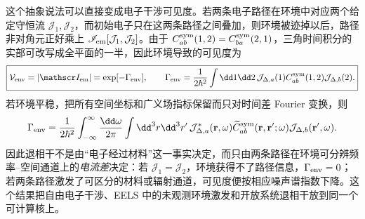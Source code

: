 这个抽象说法可以直接变成电子干涉可见度。若两条电子路径在环境中对应两个给定守恒流 $\mathcal J_1,\mathcal J_2$，而初始电子只在这两条路径之间叠加，则环境被迹掉以后，路径非对角元正好乘上 $\mathscr I_{\rm em}[\mathcal J_1,\mathcal J_2]$。由于 $C_{ab}^{\rm sym}(1,2)=C_{ba}^{\rm sym}(2,1)$，三角时间积分的实部可改写成全平面的一半，因此环境导致的可见度为
\begin{equation}
\boxed{
\mathcal V_{\rm env}
=|\mathscr I_{\rm em}|
=\exp[-\Gamma_{\rm env}],
\qquad
\Gamma_{\rm env}
=\frac1{2\hbar^2}
\int\dd1\dd2\,
\mathcal J_{\Delta,a}(1)
C_{ab}^{\rm sym}(1,2)
\mathcal J_{\Delta,b}(2).}
\label{eq:em_environment_visibility_functional}
\end{equation}
若环境平稳，把所有空间坐标和广义场指标保留而只对时间差 Fourier 变换，则
\[
\Gamma_{\rm env}
=\frac1{2\hbar^2}
\int_{-\infty}^{\infty}\frac{\dd\omega}{2\pi}
\int\dd^3r\dd^3r'\,
\mathcal J_{\Delta,a}^*(\mathbf r,\omega)
\widetilde C_{ab}^{\rm sym}(\mathbf r,\mathbf r';\omega)
\mathcal J_{\Delta,b}(\mathbf r',\omega).
\]
因此退相干不是由“电子经过材料”这一事实决定，而只由两条路径在环境可分辨频率--空间通道上的\emph{电流差}决定：若 $\mathcal J_1=\mathcal J_2$，环境获得不了路径信息，$\Gamma_{\rm env}=0$；若两条路径激发了可区分的材料或辐射通道，可见度便按相应噪声谱指数下降。这个结果把自由电子干涉、EELS 中的未观测环境激发和开放系统退相干放到同一个可计算核上。

